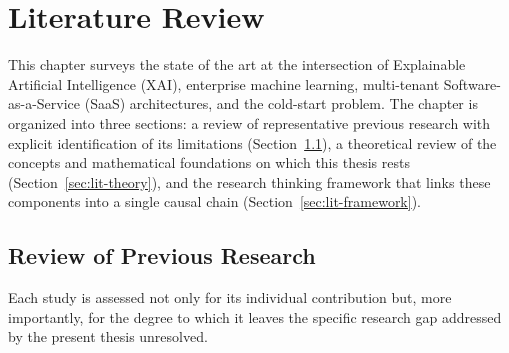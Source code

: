 \chapter{Literature Review}
\label{ch:literature-review}

This chapter surveys the state of the art at the intersection of Explainable
Artificial Intelligence (XAI), enterprise machine learning, multi-tenant
Software-as-a-Service (SaaS) architectures, and the cold-start problem. The
chapter is organized into three sections: a review of representative previous
research with explicit identification of its limitations
(Section~\ref{sec:lit-prev}), a theoretical review of the concepts and
mathematical foundations on which this thesis rests (Section~\ref{sec:lit-theory}),
and the research thinking framework that links these components into a single
causal chain (Section~\ref{sec:lit-framework}).

\section{Review of Previous Research}
\label{sec:lit-prev}

Each study is assessed not only for its individual contribution but, more
importantly, for the degree to which it leaves the specific research gap
addressed by the present thesis unresolved.


